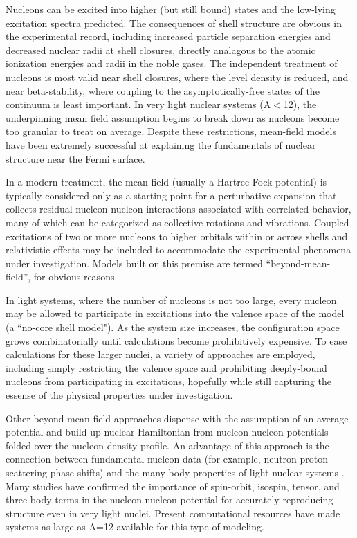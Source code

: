 Nucleons can be
excited into higher (but still bound) states and the low-lying excitation
spectra predicted. The consequences of shell structure are obvious
in the experimental record, including increased particle separation 
energies and decreased nuclear radii at shell closures, directly analagous to
the atomic ionization energies and radii in the noble gases. The independent
treatment of nucleons is most valid near shell closures,
where the level density is reduced, and near beta-stability, where coupling to
the asymptotically-free states of the continuum is least important. In very light nuclear
systems (A$<$12), the underpinning mean field assumption begins to break down as
nucleons become too granular to treat on average. Despite these restrictions, mean-field models have
been extremely successful at explaining the fundamentals of nuclear structure near the Fermi
surface.

In a modern treatment, the mean field (usually a Hartree-Fock potential)
is typically considered only as a starting point for a perturbative
expansion that collects residual nucleon-nucleon interactions associated with
correlated behavior, many of which can be categorized as collective rotations
and vibrations. Coupled excitations of
two or more nucleons to higher orbitals within or across shells and relativistic effects may 
be included to accommodate the experimental phenomena under investigation.
Models built on this premise are termed ``beyond-mean-field'', for obvious reasons.

In light systems, where the number of nucleons is not too large, every nucleon
may be allowed to participate in excitations into the valence space of the model
(a ``no-core shell model"). As the system size increases, the configuration space grows
combinatorially until calculations become prohibitively expensive. To ease calculations for these 
larger nuclei, a variety of approaches
are employed, including simply restricting the valence space and prohibiting deeply-bound 
nucleons from participating in excitations, hopefully while still capturing the
essense of the physical properties under investigation.


Other beyond-mean-field approaches dispense with the assumption of an average
potential and build up nuclear Hamiltonian from nucleon-nucleon potentials
folded over the nucleon density profile. An advantage
of this approach is the connection between fundamental nucleon data
(for example, neutron-proton scattering phase shifts) and the many-body
properties of light nuclear systems \cite{AV18}. Many studies have
confirmed the importance of spin-orbit, isospin, tensor, and three-body terms
in the nucleon-nucleon potential for accurately reproducing structure even in
very light nuclei. Present computational resources have made systems as large as A=12 available for
this type of modeling.

